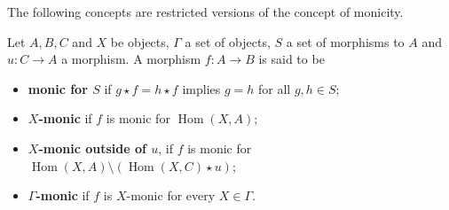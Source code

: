The following concepts are restricted versions of the concept of monicity.
\begin{definition}
    \label{def:relative_monicity}
    Let $A,B,C$ and $X$ be objects, $\Gamma$ a set of objects, $S$ a set of morphisms to $A$ and $u:C \mathop{\to} A$ a morphism. A morphism $f : A \mathop{\to} B$ is said to be
    \begin{itemize} 
        \item 
            \textbf{monic for $S$} 
            if $g \mathop{\star} f \mathop{=} h \mathop{\star} f$ implies $g \mathop{=} h$ for all $g, h \mathop{\in} S$;
        \item 
            \textbf{$X$-monic} if $f$ is monic for $\operatorname{Hom}(X, A)$;
        \item \textbf{$X$-monic outside of $u$}, if $f$ is monic for \( \operatorname{Hom}(X,A) \mathop{\setminus} \left ( \operatorname{Hom}(X,C) \mathop{\star} u \right ) \);
        \item  \textbf{$\Gamma$-monic} if $f$ is $X$-monic for every $X \mathop{\in} \Gamma$.
    \end{itemize}
\end{definition} 
